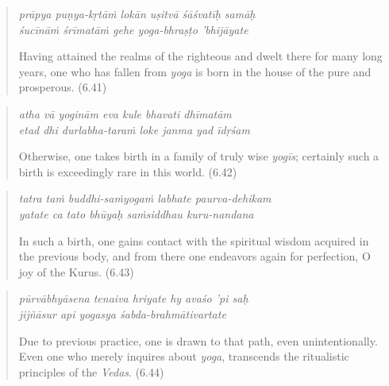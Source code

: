 \documentclass[12pt, twoside, openright]{memoir}
\begin{document}
\par
\begin{verse}
\textit{prāpya puṇya-kṛtāṁ lokān uṣitvā śāśvatīḥ samāḥ} \\
\textit{śucīnāṁ śrīmatāṁ gehe yoga-bhraṣṭo ’bhijāyate}

\noindent Having attained the realms of the righteous and dwelt there for many long years, one who has fallen from \textit{yoga} is born in the house of the pure and prosperous. (6.41)
\end{verse}
\par



\par
\begin{verse}
\textit{atha vā yoginām eva kule bhavati dhīmatām} \\
\textit{etad dhi durlabha-taraṁ loke janma yad īdṛśam}

\noindent Otherwise, one takes birth in a family of truly wise \textit{yogīs}; certainly such a birth is exceedingly rare in this world. (6.42)
\end{verse}
\par



\par
\begin{verse}
\textit{tatra taṁ buddhi-saṁyogaṁ labhate paurva-dehikam} \\
\textit{yatate ca tato bhūyaḥ saṁsiddhau kuru-nandana}

\noindent In such a birth, one gains contact with the spiritual wisdom acquired in the previous body, and from there one endeavors again for perfection, O joy of the Kurus. (6.43)
\end{verse}
\par



\par
\begin{verse}
\textit{pūrvābhyāsena tenaiva hriyate hy avaśo ’pi saḥ} \\
\textit{jijñāsur api yogasya śabda-brahmātivartate}

\noindent Due to previous practice, one is drawn to that path, even unintentionally. Even one who merely inquires about \textit{yoga}, transcends the ritualistic principles of the \textit{Vedas}. (6.44)
\end{verse}
\par
\end{document}
